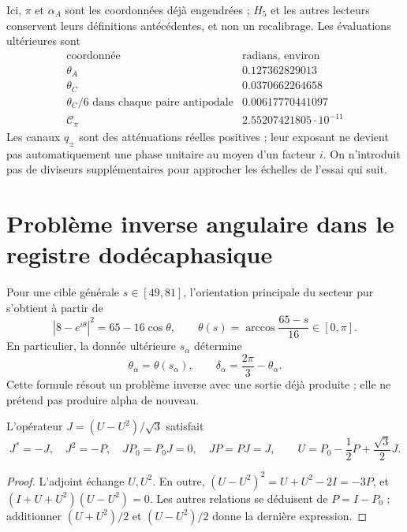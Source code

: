 Ici, \(\pi\) et \(\alpha_A\) sont les coordonnées déjà engendrées ;
\(H_5\) et les autres lecteurs conservent leurs définitions
antécédentes, et non un recalibrage. Les évaluations ultérieures sont
\[
\begin{array}{c|c}
 \text{coordonnée}&\text{radians, environ}\\\hline
 \theta_A&0.127362829013\\
 \theta_C&0.0370662264658\\
 \theta_C/6\text{ dans chaque paire antipodale}&0.00617770441097\\
 \mathcal C_\pi&2.55207421805\cdot10^{-11}
\end{array}
\]
Les canaux \(q_\pm\) sont des atténuations réelles positives ; leur exposant
ne devient pas automatiquement une phase unitaire au moyen d’un facteur
\(i\). On n’introduit pas de diviseurs supplémentaires pour approcher les
échelles de l’essai qui suit.

\section{Problème inverse angulaire dans le registre dodécaphasique}
\label{x_reciprocidad:lib02:ensayo-angular}

Pour une cible générale \(s\in[49,81]\), l'orientation principale du secteur pur s'obtient à partir de
\[
 |8-e^{i\theta}|^2=65-16\cos\theta,
 \qquad \theta(s)=\arccos\frac{65-s}{16}\in[0,\pi].
\]
En particulier, la donnée ultérieure \(s_\alpha\) détermine
\[
 \theta_\alpha=\theta(s_\alpha),\qquad
 \delta_\alpha=\frac{2\pi}{3}-\theta_\alpha.
\]
Cette formule résout un problème inverse avec une sortie déjà produite ;
elle ne prétend pas produire alpha de nouveau.

\begin{lemma}
\label{x_reciprocidad:lib02:J}
L'opérateur \(J=(U-U^2)/\sqrt3\) satisfait
\[
 J^*=-J,\quad J^2=-P,\quad JP_0=P_0J=0,\quad JP=PJ=J,
 \qquad U=P_0-\frac12P+\frac{\sqrt3}{2}J.
\]
\end{lemma}
\begin{proof}
L’adjoint échange \(U,U^2\). En outre,
\((U-U^2)^2=U+U^2-2I=-3P\), et
\((I+U+U^2)(U-U^2)=0\). Les autres relations se déduisent de
\(P=I-P_0\) ; additionner \((U+U^2)/2\) et \((U-U^2)/2\)
donne la dernière expression.
\end{proof}

